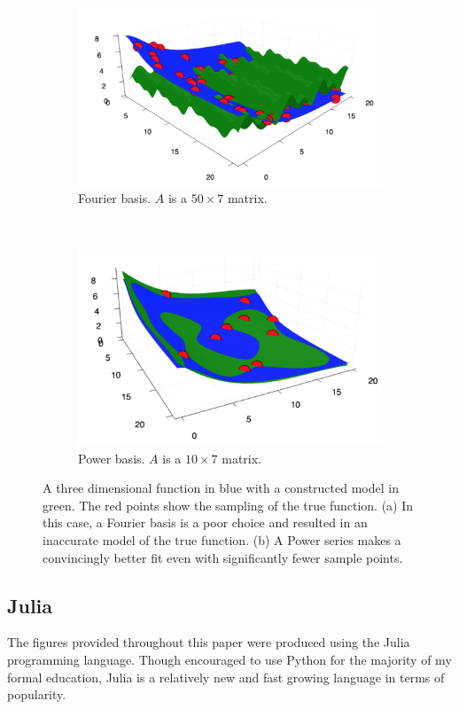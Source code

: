 \begin{figure}
  \begin{subfigure}{0.35\textwidth}
    \includegraphics[width=\linewidth]{Figures/3dFourier}
    \caption{Fourier basis. $A$ is a $50\times7$ matrix.} 
    \label{fig:3dFourier}
  \end{subfigure}%
  \\
  \begin{subfigure}{0.35\textwidth}
    \includegraphics[width=\linewidth]{Figures/3dPower}
    \caption{Power basis. $A$ is a $10\times7$ matrix.} 
    \label{fig:3dPower}
  \end{subfigure}%
\caption{A three dimensional function in blue with a constructed model in green. The red points show the sampling of the true function. (a) In this case, a Fourier basis is a poor choice and resulted in an inaccurate model of the true function. (b) A Power series makes a convincingly better fit even with significantly fewer sample points.} \label{fig:3dFit}
\end{figure}


\subsection{Julia}\label{Sect:julia}
The figures provided throughout this paper were produced using the Julia programming language. Though encouraged to use Python for the majority of my formal education, Julia is a relatively new and fast growing language in terms of popularity. 

